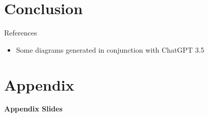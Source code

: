 \documentclass{beamer}
\begin{document}
\section*{Conclusion}



\begin{frame}[allowframebreaks]{References}
    \begin{itemize}
    \item Some diagrams generated in conjunction with ChatGPT 3.5
    \end{itemize}
    \printbibliography 
\end{frame}



\section*{Appendix}

\begin{frame}{}
\bf{\LARGE Appendix Slides}    
\end{frame}
\end{document}
